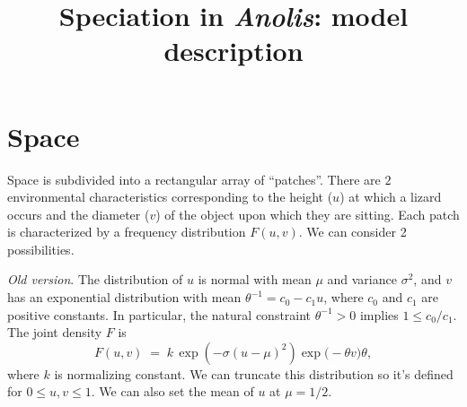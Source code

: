 \documentclass{article}
\begin{document}




\renewcommand{\baselinestretch}{1}
\normalsize




\title{Speciation in {\em Anolis}: model description}

\maketitle


\section{Space}

Space is subdivided into a rectangular array of ``patches''. There are
$2$ environmental characteristics corresponding to the height ($u$) at
which a lizard occurs and the diameter ($v$) of the object upon which
they are sitting. Each patch is characterized by a frequency
distribution $F(u,v)$. We can consider 2 possibilities.

{\em Old version}.\quad
The distribution of $u$ is normal with mean $\mu$ and variance $\sigma^2$, 
and $v$ has an exponential distribution with mean
$\theta^{-1} = c_0 - c_1 u$, where $c_0$ and $c_1$ are positive
constants.  In particular, the natural constraint $\theta^{-1} > 0$
implies $1 \le c_0/c_1$.  The joint density $F$ is
\begin{equation} \label{gaus}
F(u,v) \; = \;
k \,\exp (- \sigma (u - \mu)^2 )\exp\Big(\!- \theta  v \Big) \theta,
\end{equation}
where $k$ is normalizing constant.
We can truncate this distribution so it's defined for $0\leq u,v \leq 1$.
We can also set the mean of $u$ at $\mu=1/2$.
\end{document}
